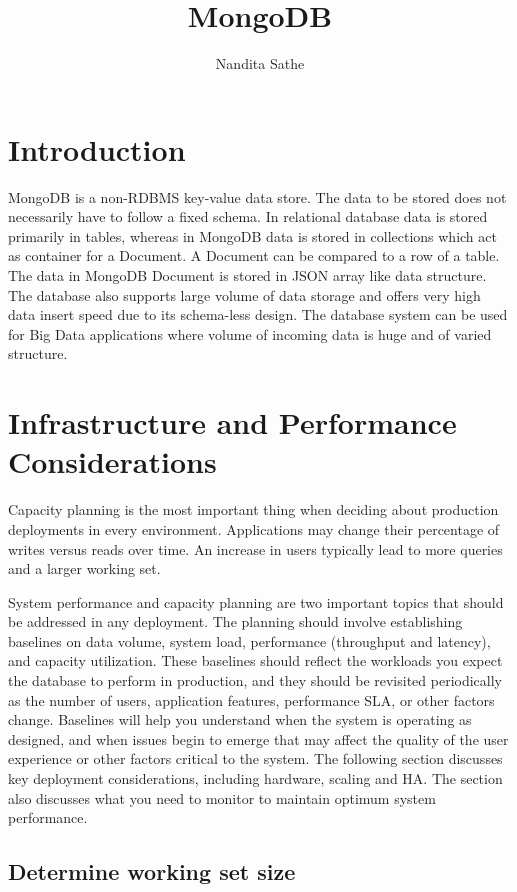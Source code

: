 \documentclass[9pt,twocolumn,twoside]{styles/osajnl}
\title{MongoDB}
\author[1,*]{Nandita Sathe}
\affil[1]{School of Informatics and Computing, Bloomington, IN 47408, U.S.A.}
\affil[*]{Corresponding author: nsathe@iu.edu}
\begin{document}
\maketitle

\section{Introduction}

MongoDB is a non-RDBMS key-value data store. The data to be stored does not necessarily have to follow a fixed schema. In relational database data is stored primarily in tables, whereas in MongoDB data is stored in collections which act as container for a Document. A Document can be compared to a row of a table. The data in MongoDB Document is stored in JSON array like data structure. The database also supports large volume of data storage and offers very high data insert speed due to its schema-less design. The database system can be used for Big Data applications where volume of incoming data is huge and of varied structure.

\section{Infrastructure and Performance Considerations}

Capacity planning is the most important thing when deciding about production deployments in every environment. Applications may change their percentage of writes versus reads over time. An increase in users typically lead to more queries and a larger working set.

System performance and capacity planning are two important topics that should be addressed in any deployment. The planning should involve establishing baselines on data volume, system load, performance (throughput and latency), and capacity utilization. These baselines should reflect the workloads you expect the database to perform in production, and they should be revisited periodically as the number of users, application features, performance SLA, or other factors change. Baselines will help you understand when the system is operating as designed, and when issues begin to emerge that may affect the quality of the user experience or other factors critical to the system. The following section discusses key deployment considerations, including hardware, scaling and HA. The section also discusses what you need to monitor to maintain optimum system performance.

\subsection{Determine working set size}
\end{document}
